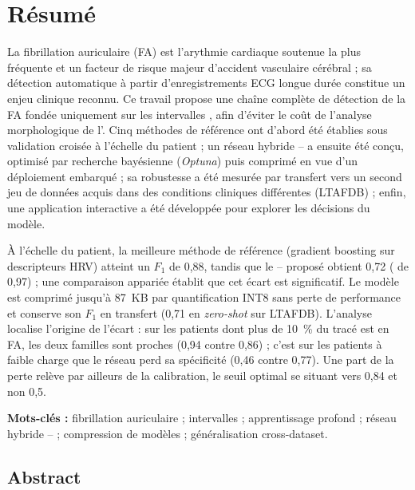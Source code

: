 \chapter*{Résumé}
\begingroup
\singlespacing

La fibrillation auriculaire (FA) est l'arythmie cardiaque soutenue la plus fréquente et un facteur de risque majeur d'accident vasculaire cérébral ; sa détection automatique à partir d'enregistrements ECG longue durée constitue un enjeu clinique reconnu. Ce travail propose une chaîne complète de détection de la FA fondée uniquement sur les intervalles \RR{}, afin d'éviter le coût de l'analyse morphologique de l'\ECG{}. Cinq méthodes de référence ont d'abord été établies sous validation croisée à l'échelle du patient ; un réseau hybride \CNN--\LSTM{} a ensuite été conçu, optimisé par recherche bayésienne (\textit{Optuna}) puis comprimé en vue d'un déploiement embarqué ; sa robustesse a été mesurée par transfert vers un second jeu de données acquis dans des conditions cliniques différentes (LTAFDB) ; enfin, une application interactive a été développée pour explorer les décisions du modèle.

À l'échelle du patient, la meilleure méthode de référence (gradient boosting sur descripteurs HRV) atteint un \(F_1\) de 0,88, tandis que le \CNN--\LSTM{} proposé obtient 0,72 (\AUROC{} de 0,97) ; une comparaison appariée établit que cet écart est significatif. Le modèle est comprimé jusqu'à 87~KB par quantification INT8 sans perte de performance et conserve son \(F_1\) en transfert (0,71 en \textit{zero-shot} sur LTAFDB). L'analyse localise l'origine de l'écart : sur les patients dont plus de 10~\% du tracé est en FA, les deux familles sont proches (0,94 contre 0,86) ; c'est sur les patients à faible charge que le réseau perd sa spécificité (0,46 contre 0,77). Une part de la perte relève par ailleurs de la calibration, le seuil optimal se situant vers 0,84 et non 0,5.

\smallskip
\noindent\textbf{Mots-clés :} fibrillation auriculaire ; intervalles \RR{} ; apprentissage profond ; réseau hybride \CNN--\LSTM{} ; compression de modèles ; généralisation cross-dataset.

\bigskip
\section*{Abstract}

